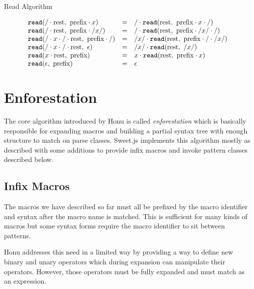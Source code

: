 \documentclass[preprint,10pt]{sigplanconf}
\begin{document}
\begin{displayfigure*}{\label{fig:read}Read Algorithm}
  
\[
  \begin{array}{lcl}
    \texttt{read}(/\cdot \textrm{rest},~\textrm{prefix}\cdot x)
    &=&
    / \cdot 
      \texttt{read}(\textrm{rest},~
        \textrm{prefix}\cdot x\cdot /
      )
   
    \\
    \texttt{read}(/\cdot \textrm{rest},~\textrm{prefix}\cdot /x/)
    &=&
    / \cdot 
      \texttt{read}(\textrm{rest},~
        \textrm{prefix}\cdot /x/ \cdot /
      )
   
    \\
    \texttt{read}(/\cdot x \cdot /\cdot\textrm{rest},~\textrm{prefix}\cdot /)
    &=&
    /x/ \cdot 
      \texttt{read}(\textrm{rest},~
        \textrm{prefix}\cdot / \cdot /x/
      )
   
    \\
    \texttt{read}(/\cdot x \cdot /\cdot\textrm{rest},~\epsilon)
    &=&
    /x/ \cdot 
      \texttt{read}(\textrm{rest},~/x/)
   
    \\
    \texttt{read}(x \cdot \textrm{rest},~\textrm{prefix})
    &=&
    x \cdot 
      \texttt{read}(\textrm{rest},~\textrm{prefix}\cdot x)
   
    \\
    \texttt{read}(\epsilon,~\textrm{prefix})
    &=&
    \epsilon
  \end{array}
\]
\end{displayfigure*}

\section{Enforestation}
\label{sec-4}

The core algorithm introduced by Honu is called \emph{enforestation} which
is basically responsible for expanding macros and building a partial
syntax tree with enough structure to match on parse classes. Sweet.js
implements this algorithm mostly as described with some additions to
provide infix macros and invoke pattern classes described below.

\subsection{Infix Macros}
\label{sec-4-1}
The macros we have described so far must all be prefixed by the macro
identifier and syntax after the macro name is matched. This is
sufficient for many kinds of macros but some syntax forms require the
macro identifier to sit between patterns.

Honu addresses this need in a limited way by providing a way to define
new binary and unary operators which during expansion can manipulate
their operators. However, those operators must be fully expanded and
must match as an expression.
\end{document}
